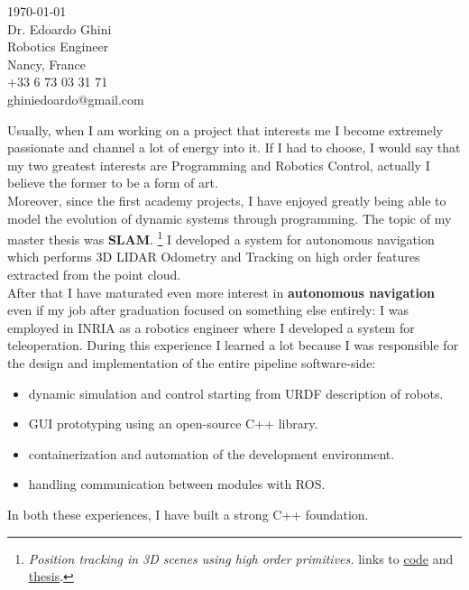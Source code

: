 \documentclass[11pt]{article}
\newcommand{\company}{Tesla}
\begin{document}
\begin{FlushRight}
\today\\
\bigskip
{\sffamily Dr. Edoardo Ghini}\\
\textcolor{headings}{Robotics Engineer}\\
\medskip
Nancy, France\\
+33 6 73 03 31 71\\
ghiniedoardo@gmail.com
\end{FlushRight}

\begin{FlushLeft}


Usually, when I am working on a project that interests me
 I become extremely passionate and channel a lot of energy into it.
If I had to choose, I would say that my two greatest interests are
 Programming and Robotics Control, actually I believe the former to be a form of art.\\\smallskip
Moreover, since the first academy projects, I have enjoyed greatly
  being able to model the evolution of dynamic systems through programming.
  The topic of my master thesis was \textbf{SLAM}.
  \footnote{ \textit{Position tracking in 3D scenes using high order primitives.}
  \quad links to \href{https://github.com/dinies/3D-Lidar-Odometry-and-Tracking}{code} and 
  \href{https://github.com/dinies/MasterThesis-ArtificialIntelligence-Robotics/blob/master/MaterThesis_Edoardo_Ghini.pdf}
  {thesis}.}
I developed a system for autonomous navigation which performs
 3D LIDAR Odometry and Tracking on high order features extracted from the point cloud.\\\smallskip
After that I have maturated even more interest in \textbf{autonomous navigation }
 even if my job after graduation focused on something else entirely:
 I was employed in INRIA as a robotics engineer where I developed  a system for teleoperation.
During this experience I learned a lot because I was responsible
 for the design and implementation of the entire pipeline software-side:
\begin{itemize}
  \item  dynamic simulation and control starting from URDF description of robots.
  \item  GUI prototyping using an open-source C++ library.
  \item  containerization and automation of the development environment.
  \item  handling communication between modules with ROS.
\end{itemize}
In both these experiences, I have built a strong C++ foundation.\\\smallskip

\end{FlushLeft}
\end{document}
